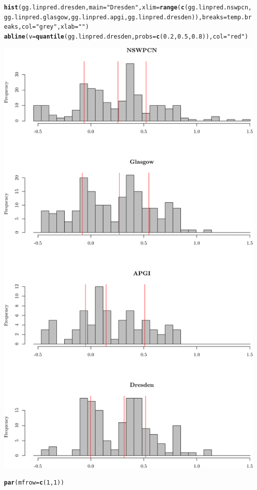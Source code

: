 \documentclass{article}\usepackage[]{graphicx}\usepackage[]{color}
\makeatletter
\def\maxwidth{ %
  \ifdim\Gin@nat@width>\linewidth
    \linewidth
  \else
    \Gin@nat@width
  \fi
}
\newcommand{\hlnum}[1]{\textcolor[rgb]{0.686,0.059,0.569}{#1}}%
\newcommand{\hlstr}[1]{\textcolor[rgb]{0.192,0.494,0.8}{#1}}%
\newcommand{\hlstd}[1]{\textcolor[rgb]{0.345,0.345,0.345}{#1}}%
\newcommand{\hlkwc}[1]{\textcolor[rgb]{0.333,0.667,0.333}{#1}}%
\newcommand{\hlkwd}[1]{\textcolor[rgb]{0.737,0.353,0.396}{\textbf{#1}}}%
\newenvironment{kframe}{%
 \def\at@end@of@kframe{}%
 \ifinner\ifhmode%
  \def\at@end@of@kframe{\end{minipage}}%
  \begin{minipage}{\columnwidth}%
 \fi\fi%
 \def\FrameCommand##1{\hskip\@totalleftmargin \hskip-\fboxsep
 \colorbox{shadecolor}{##1}\hskip-\fboxsep
     \hskip-\linewidth \hskip-\@totalleftmargin \hskip\columnwidth}%
 \MakeFramed {\advance\hsize-\width
   \@totalleftmargin\z@ \linewidth\hsize
   \@setminipage}}%
 {\par\unskip\endMakeFramed%
 \at@end@of@kframe}
\newenvironment{knitrout}{}{} %
\makeatother
\begin{document}
\begin{knitrout}
\begin{kframe}
\begin{alltt}
\hlkwd{hist}\hlstd{(gg.linpred.dresden,} \hlkwc{main} \hlstd{=} \hlstr{"Dresden"}\hlstd{,} \hlkwc{xlim} \hlstd{=} \hlkwd{range}\hlstd{(}\hlkwd{c}\hlstd{(gg.linpred.nswpcn, gg.linpred.glasgow, gg.linpred.apgi, gg.linpred.dresden)),} \hlkwc{breaks} \hlstd{= temp.breaks,} \hlkwc{col} \hlstd{=} \hlstr{"grey"}\hlstd{,} \hlkwc{xlab} \hlstd{=} \hlstr{""}\hlstd{)}
\hlkwd{abline}\hlstd{(}\hlkwc{v} \hlstd{=} \hlkwd{quantile}\hlstd{(gg.linpred.dresden,} \hlkwc{probs} \hlstd{=} \hlkwd{c}\hlstd{(}\hlnum{0.2}\hlstd{,} \hlnum{0.5}\hlstd{,} \hlnum{0.8}\hlstd{)),} \hlkwc{col} \hlstd{=} \hlstr{"red"}\hlstd{)}
\end{alltt}
\end{kframe}

{\centering \includegraphics[width=\maxwidth]{figure/07-score-hists-1} 

}


\begin{kframe}\begin{alltt}
\hlkwd{par}\hlstd{(}\hlkwc{mfrow} \hlstd{=} \hlkwd{c}\hlstd{(}\hlnum{1}\hlstd{,} \hlnum{1}\hlstd{))}
\end{alltt}
\end{kframe}
\end{knitrout}
\end{document}
